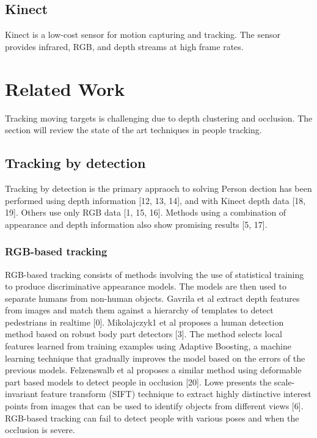 \documentclass[paper=a4, fontsize=11pt]{scrartcl}
\numberwithin{equation}{section}		%
\numberwithin{figure}{section}			%
\numberwithin{table}{section}				%
\begin{document}
\subsection{Kinect}

Kinect is a low-cost sensor for motion capturing and tracking. The sensor provides infrared, RGB, and depth streams at high frame rates.

\section{Related Work}

Tracking moving targets is challenging due to depth clustering and occlusion.  The section will review the state of the art techniques in people tracking.

\subsection{Tracking by detection}

Tracking by detection is the primary appraoch to solving Person dection has been performed using depth information [12, 13, 14], and with Kinect depth data [18, 19]. Others use only RGB data [1, 15, 16]. Methods using a combination of appearance and depth information also show promising results [5, 17]. 

\subsubsection{RGB-based tracking}

RGB-based tracking consists of methods involving the use of statistical training to produce discriminative appearance models. The models are then used to separate humans from non-human objects. Gavrila et al extract depth features from images and match them against a hierarchy of templates to detect pedestrians in realtime [0]. Mikolajczyk1 et al proposes a human detection method based on robust body part detectors [3]. The method selects local features learned from training examples using Adaptive Boosting, a machine learning technique that gradually improves the model based on the errors of the previous models. Felzenswalb et al proposes a similar method using deformable part based models to detect people in occlusion [20]. Lowe presents the scale-invariant feature transform (SIFT) technique to extract highly distinctive interest points from images that can be used to identify objects from different views [6]. RGB-based tracking can fail to detect people with various poses and when the occlusion is severe.
\end{document}
